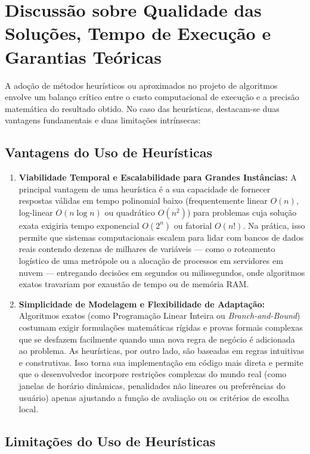 \section{Discussão sobre Qualidade das Soluções, Tempo de Execução e Garantias Teóricas}

A adoção de métodos heurísticos ou aproximados no projeto de algoritmos envolve um balanço crítico entre o custo computacional de execução e a precisão matemática do resultado obtido. No caso das heurísticas, destacam-se duas vantagens fundamentais e duas limitações intrínsecas:

\subsection{Vantagens do Uso de Heurísticas}

\begin{enumerate}
    \item \textbf{Viabilidade Temporal e Escalabilidade para Grandes Instâncias:} A principal vantagem de uma heurística é a sua capacidade de fornecer respostas válidas em tempo polinomial baixo (frequentemente linear $O(n)$, log-linear $O(n \log n)$ ou quadrático $O(n^2)$) para problemas cuja solução exata exigiria tempo exponencial $O(2^n)$ ou fatorial $O(n!)$. Na prática, isso permite que sistemas computacionais escalem para lidar com bancos de dados reais contendo dezenas de milhares de variáveis --- como o roteamento logístico de uma metrópole ou a alocação de processos em servidores em nuvem --- entregando decisões em segundos ou milissegundos, onde algoritmos exatos travariam por exaustão de tempo ou de memória RAM.
    \item \textbf{Simplicidade de Modelagem e Flexibilidade de Adaptação:} Algoritmos exatos (como Programação Linear Inteira ou \textit{Branch-and-Bound}) costumam exigir formulações matemáticas rígidas e provas formais complexas que se desfazem facilmente quando uma nova regra de negócio é adicionada ao problema. As heurísticas, por outro lado, são baseadas em regras intuitivas e construtivas. Isso torna sua implementação em código mais direta e permite que o desenvolvedor incorpore restrições complexas do mundo real (como janelas de horário dinâmicas, penalidades não lineares ou preferências do usuário) apenas ajustando a função de avaliação ou os critérios de escolha local.
\end{enumerate}

\subsection{Limitações do Uso de Heurísticas}

